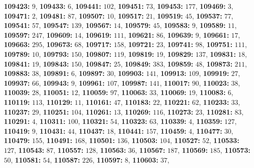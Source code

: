 \textsf{\bfseries 109423:} $9$, \textsf{\bfseries 109433:} $6$, \textsf{\bfseries 109441:} $102$, \textsf{\bfseries 109451:} $73$, \textsf{\bfseries 109453:} $177$, \textsf{\bfseries 109469:} $3$, \textsf{\bfseries 109471:} $2$, \textsf{\bfseries 109481:} $87$, \textsf{\bfseries 109507:} $10$, \textsf{\bfseries 109517:} $21$, \textsf{\bfseries 109519:} $45$, \textsf{\bfseries 109537:} $77$, \textsf{\bfseries 109541:} $57$, \textsf{\bfseries 109547:} $139$, \textsf{\bfseries 109567:} $14$, \textsf{\bfseries 109579:} $45$, \textsf{\bfseries 109583:} $9$, \textsf{\bfseries 109589:} $11$, \textsf{\bfseries 109597:} $247$, \textsf{\bfseries 109609:} $14$, \textsf{\bfseries 109619:} $111$, \textsf{\bfseries 109621:} $86$, \textsf{\bfseries 109639:} $9$, \textsf{\bfseries 109661:} $17$, \textsf{\bfseries 109663:} $295$, \textsf{\bfseries 109673:} $68$, \textsf{\bfseries 109717:} $158$, \textsf{\bfseries 109721:} $23$, \textsf{\bfseries 109741:} $98$, \textsf{\bfseries 109751:} $111$, \textsf{\bfseries 109789:} $10$, \textsf{\bfseries 109793:} $150$, \textsf{\bfseries 109807:} $119$, \textsf{\bfseries 109819:} $19$, \textsf{\bfseries 109829:} $137$, \textsf{\bfseries 109831:} $18$, \textsf{\bfseries 109841:} $19$, \textsf{\bfseries 109843:} $150$, \textsf{\bfseries 109847:} $25$, \textsf{\bfseries 109849:} $383$, \textsf{\bfseries 109859:} $48$, \textsf{\bfseries 109873:} $211$, \textsf{\bfseries 109883:} $38$, \textsf{\bfseries 109891:} $6$, \textsf{\bfseries 109897:} $30$, \textsf{\bfseries 109903:} $141$, \textsf{\bfseries 109913:} $109$, \textsf{\bfseries 109919:} $27$, \textsf{\bfseries 109937:} $66$, \textsf{\bfseries 109943:} $9$, \textsf{\bfseries 109961:} $107$, \textsf{\bfseries 109987:} $141$, \textsf{\bfseries 110017:} $90$, \textsf{\bfseries 110023:} $38$, \textsf{\bfseries 110039:} $28$, \textsf{\bfseries 110051:} $12$, \textsf{\bfseries 110059:} $97$, \textsf{\bfseries 110063:} $33$, \textsf{\bfseries 110069:} $19$, \textsf{\bfseries 110083:} $6$, \textsf{\bfseries 110119:} $113$, \textsf{\bfseries 110129:} $11$, \textsf{\bfseries 110161:} $47$, \textsf{\bfseries 110183:} $22$, \textsf{\bfseries 110221:} $62$, \textsf{\bfseries 110233:} $33$, \textsf{\bfseries 110237:} $29$, \textsf{\bfseries 110251:} $104$, \textsf{\bfseries 110261:} $13$, \textsf{\bfseries 110269:} $116$, \textsf{\bfseries 110273:} $23$, \textsf{\bfseries 110281:} $83$, \textsf{\bfseries 110291:} $4$, \textsf{\bfseries 110311:} $100$, \textsf{\bfseries 110321:} $54$, \textsf{\bfseries 110323:} $63$, \textsf{\bfseries 110339:} $4$, \textsf{\bfseries 110359:} $127$, \textsf{\bfseries 110419:} $9$, \textsf{\bfseries 110431:} $44$, \textsf{\bfseries 110437:} $18$, \textsf{\bfseries 110441:} $157$, \textsf{\bfseries 110459:} $4$, \textsf{\bfseries 110477:} $30$, \textsf{\bfseries 110479:} $155$, \textsf{\bfseries 110491:} $168$, \textsf{\bfseries 110501:} $136$, \textsf{\bfseries 110503:} $104$, \textsf{\bfseries 110527:} $52$, \textsf{\bfseries 110533:} $127$, \textsf{\bfseries 110543:} $87$, \textsf{\bfseries 110557:} $128$, \textsf{\bfseries 110563:} $36$, \textsf{\bfseries 110567:} $187$, \textsf{\bfseries 110569:} $185$, \textsf{\bfseries 110573:} $50$, \textsf{\bfseries 110581:} $54$, \textsf{\bfseries 110587:} $226$, \textsf{\bfseries 110597:} $8$, \textsf{\bfseries 110603:} $37$, 
